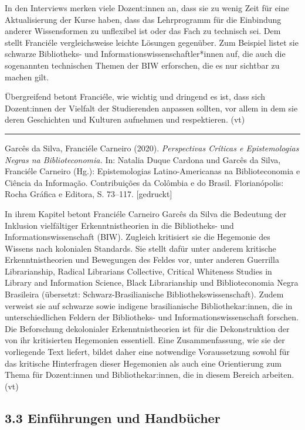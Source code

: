 \documentclass[a4paper,
fontsize=11pt,
oneside,
numbers=noperiodatend,
parskip=half-,
bibliography=totoc,
final
]{scrartcl}
\begin{document}
In den Interviews merken viele Dozent:innen an, dass sie zu wenig Zeit
für eine Aktualisierung der Kurse haben, dass das Lehrprogramm für
die Einbindung anderer Wissensformen zu unflexibel ist oder das Fach zu
technisch sei. Dem stellt Franciéle vergleichsweise leichte Lösungen
gegenüber. Zum Beispiel listet sie schwarze Bibliotheks- und
Informationswissenschaftler*innen auf, die auch die sogenannten
technischen Themen der BIW erforschen, die es nur sichtbar zu machen
gilt.

Übergreifend betont Franciéle, wie wichtig und dringend es ist, dass
sich Dozent:innen der Vielfalt der Studierenden anpassen sollten, vor
allem in dem sie deren Geschichten und Kulturen aufnehmen und
respektieren. (vt)

\begin{center}\rule{0.5\linewidth}{0.5pt}\end{center}

Garcês da Silva, Franciéle Carneiro (2020). \emph{Perspectivas Críticas
e Epistemologias Negras na Biblioteconomia.} In: Natalia Duque Cardona
und Garcês da Silva, Franciéle Carneiro (Hg.): Epistemologias
Latino-Americanas na Biblioteconomia e Ciência da Informação.
Contribuições da Colômbia e do Brasil. Florianópolis: Rocha Gráfica e
Editora, S. 73--117. {[}gedruckt{]}

In ihrem Kapitel betont Franciéle Carneiro Garcês da Silva die Bedeutung
der Inklusion vielfältiger Erkenntnistheorien in die Bibliotheks- und
Informationswissenschaft (BIW). Zugleich kritisiert sie die Hegemonie
des Wissens nach kolonialen Standards. Sie stellt dafür unter anderem
kritische Erkenntnistheorien und Bewegungen des Feldes vor, unter
anderen Guerrilla Librarianship, Radical Librarians Collective, Critical
Whiteness Studies in Library and Information Science, Black
Librarianship und Biblioteconomia Negra Brasileira (übersetzt:
Schwarz-Brasilianische Bibliothekswissenschaft). Zudem verweist sie auf
schwarze sowie indigene brasilianische Bibliothekar:innen, die in
unterschiedlichen Feldern der Bibliotheks- und Informationswissenschaft
forschen. Die Beforschung dekolonialer Erkenntnistheorien ist für die
Dekonstruktion der von ihr kritisierten Hegemonien essentiell. Eine
Zusammenfassung, wie sie der vorliegende Text liefert, bildet daher eine
notwendige Voraussetzung sowohl für das kritische Hinterfragen dieser
Hegemonien als auch eine Orientierung zum Thema für Dozent:innen und
Bibliothekar:innen, die in diesem Bereich arbeiten. (vt)

\hypertarget{einfuxfchrungen-und-handbuxfccher}{%
\subsection{3.3 Einführungen und
Handbücher}\label{einfuxfchrungen-und-handbuxfccher}}
\end{document}
